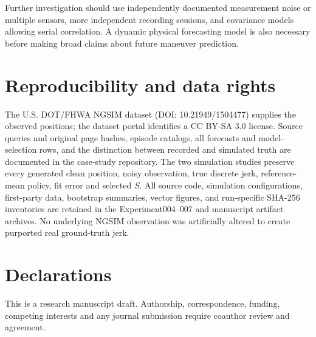 Further investigation should
use independently documented
measurement noise or multiple
sensors, more independent
recording sessions, and
covariance models allowing
serial correlation. A
dynamic physical forecasting
model is also necessary
before making broad claims
about future maneuver prediction.

\section*{Reproducibility and data rights}
The U.S. DOT/FHWA NGSIM dataset
(DOI: 10.21949/1504477) supplies
the observed positions; the
dataset portal identifies
a CC BY-SA 3.0 license.
Source queries and original
page hashes, episode catalogs,
all forecasts and model-selection
rows, and the distinction
between recorded and simulated
truth are documented in
the case-study repository.
The two simulation studies
preserve every generated
clean position, noisy
observation, true discrete
jerk, reference-mean policy,
fit error and selected $S$.
All source code, simulation
configurations, first-party
data, bootstrap summaries,
vector figures, and
run-specific SHA-256
inventories are retained
in the Experiment004--007
and manuscript artifact
archives. No underlying
NGSIM observation was
artificially altered to
create purported real
ground-truth jerk.

\section*{Declarations}
This is a research manuscript
draft. Authorship, correspondence,
funding, competing interests
and any journal submission
require coauthor review
and agreement.
